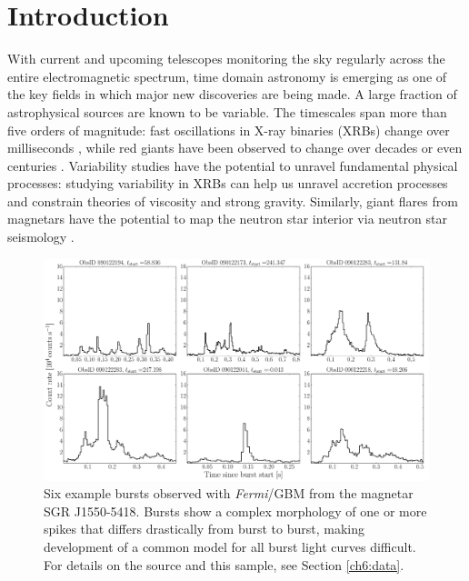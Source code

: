 \documentclass[12pt]{emulateapj}
\newcommand{\project}[1]{\textsl{#1}}
\newcommand{\fermi}{\project{Fermi}}
\begin{document}

\section{Introduction}

With current and upcoming telescopes monitoring the sky regularly across the entire electromagnetic spectrum, time domain astronomy is emerging as one of the key fields in which major 
new discoveries are being made.  A large fraction of astrophysical sources are known to be variable. The timescales span more than five orders of magnitude: fast oscillations in 
X-ray binaries (XRBs) change over milliseconds \citep[e.g.\ ][]{xrb_khzqpos}, while red giants have been observed to change over decades or even centuries \citep[e.g.\ ][]{dasch_giants}. 
Variability studies have the potential to unravel fundamental physical processes: studying variability in XRBs can help us unravel accretion processes and constrain theories of viscosity and strong gravity. 
Similarly, giant flares from magnetars have the potential to map the neutron star interior via neutron star seismology \citep{steiner2009}. 

\begin{figure}[htbp]
\begin{center}
\includegraphics[width=\textwidth]{f1.pdf}%
\caption{Six example bursts observed with \fermi/GBM from the magnetar SGR J1550-5418. Bursts show a complex morphology of one or more
spikes that differs drastically from burst to burst, making development of a common model for all burst light curves difficult. For details on the source
and this sample, see Section \ref{ch6:data}.}
\label{fig:example_bursts}
\end{center}
\end{figure}
\end{document}
